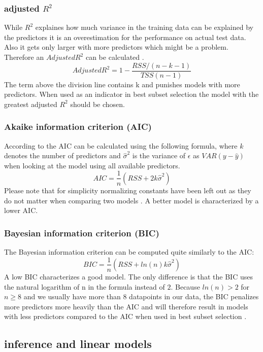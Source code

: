 \documentclass[12 pt]{scrartcl}
\begin{document}
\subsubsection{adjusted $R^2$}

While $R^2$ explaines how much variance in the training data can be explained by the predictors it is an overestimation for the performance on actual test data. Also it gets only larger with more predictors which might be a problem. Therefore an $Adjusted R^2$ can be calculated \citep[p.~234]{james2013introduction}.
\[Adjusted R^2 = 1- \frac{RSS/(n-k-1)}{TSS(n-1)}\]
The term above the division line contains k and punishes models with more predictors. When used as an indicator in best subset selection the model with the greatest adjusted $R^2$ should be chosen.

\subsubsection{Akaike information criterion (AIC) }
According to \citet[p.~234]{james2013introduction} the AIC can be calculated using the following formula, where $k$ denotes the number of predictors and $\hat{\sigma}^2$ is  the variance of $\epsilon$ as $VAR(y-\hat{y})$ when looking at the model using all available predictors.
\[AIC = \frac{1}{n}(RSS + 2k\hat{\sigma}^2)\]
Please note that for simplicity normalizing constants have been left out as they do not matter when comparing two models \citep[p.~234]{james2013introduction}.
A better model is characterized by a lower AIC.

\subsubsection{Bayesian information criterion (BIC) }

The Bayesian information criterion can be computed quite similarly to the AIC:
\[BIC = \frac{1}{n}(RSS + ln(n)k\hat{\sigma}^2)\]
A low BIC characterizes a good model. The only difference is that the BIC uses the natural logarithm of n in the formula instead of $2$. Because $ln(n) > 2$ for $n \ge 8$ and we usually have more than 8 datapoints in our data, the BIC penalizes more predictors more heavily than the AIC and will therefore result in models with less predictors compared to the AIC when used in best subset selection \citep[p.~234]{james2013introduction}.

\subsection{inference and linear models}
\end{document}

